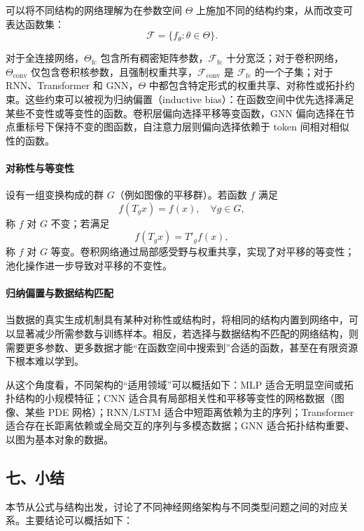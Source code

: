 可以将不同结构的网络理解为在参数空间 $\Theta$ 上施加不同的结构约束，从而改变可表达函数集：
\[
\mathcal{F} = \{f_\theta : \theta\in\Theta\}.
\]

对于全连接网络，$\Theta_{\text{fc}}$ 包含所有稠密矩阵参数，$\mathcal{F}_{\text{fc}}$ 十分宽泛；对于卷积网络，$\Theta_{\text{conv}}$ 仅包含卷积核参数，且强制权重共享，$\mathcal{F}_{\text{conv}}$ 是 $\mathcal{F}_{\text{fc}}$ 的一个子集；对于 RNN、Transformer 和 GNN，$\Theta$ 中都包含特定形式的权重共享、对称性或拓扑约束。这些约束可以被视为归纳偏置（inductive bias）：在函数空间中优先选择满足某些不变性或等变性的函数。卷积层偏向选择平移等变函数，GNN 偏向选择在节点重标号下保持不变的图函数，自注意力层则偏向选择依赖于 token 间相对相似性的函数。

\paragraph{对称性与等变性}

设有一组变换构成的群 $G$（例如图像的平移群）。若函数 $f$ 满足
\[
f(T_g x) = f(x),\quad \forall g\in G,
\]
称 $f$ 对 $G$ 不变；若满足
\[
f(T_g x) = T'_g f(x),
\]
称 $f$ 对 $G$ 等变。卷积网络通过局部感受野与权重共享，实现了对平移的等变性；池化操作进一步导致对平移的不变性。

\paragraph{归纳偏置与数据结构匹配}

当数据的真实生成机制具有某种对称性或结构时，将相同的结构内置到网络中，可以显著减少所需参数与训练样本。相反，若选择与数据结构不匹配的网络结构，则需要更多参数、更多数据才能“在函数空间中搜索到”合适的函数，甚至在有限资源下根本难以学到。

从这个角度看，不同架构的“适用领域”可以概括如下：MLP 适合无明显空间或拓扑结构的小规模特征；CNN 适合具有局部相关性和平移等变性的网格数据（图像、某些 PDE 网格）；RNN/LSTM 适合中短距离依赖为主的序列；Transformer 适合存在长距离依赖或全局交互的序列与多模态数据；GNN 适合拓扑结构重要、以图为基本对象的数据。

\subsection*{七、小结}

本节从公式与结构出发，讨论了不同神经网络架构与不同类型问题之间的对应关系。主要结论可以概括如下：

